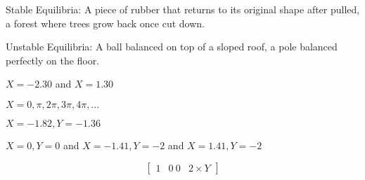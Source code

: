\documentclass[]{memoir}
\begin{document}

Stable Equilibria: A piece of rubber that returns to its original shape
after pulled, a forest where trees grow back once cut down.

Unstable Equilibria: A ball balanced on top of a sloped roof, a pole
balanced perfectly on the floor.


$X=-2.30$ and $X=1.30$


$X=0,\pi,2\pi,3\pi,4\pi,...$


$X=-1.82, Y=-1.36$


$X=0, Y=0$ and $X=-1.41, Y=-2$ and $X=1.41, Y=-2$


\[
\begin{bmatrix}
1 & 0 \
0 & 2 \times Y
\end{bmatrix}
\]

\end{document}
